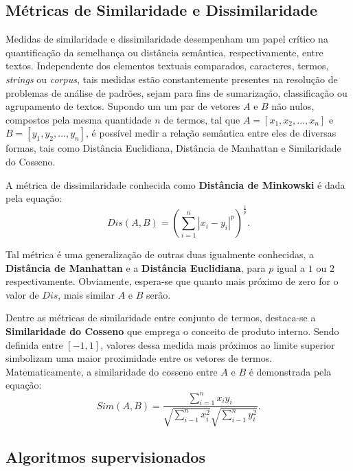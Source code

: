 \documentclass{SBCbookchapter}
\begin{document}
\subsection{Métricas de Similaridade e Dissimilaridade}
\label{subsec:similaridade}

Medidas de similaridade e dissimilaridade desempenham um papel crítico na quantificação da semelhança ou distância semântica, respectivamente, entre textos. Independente dos elementos textuais comparados, caracteres, termos, \textit{strings} ou \textit{corpus}, tais medidas estão constantemente presentes na resolução de problemas de análise de padrões, sejam para fins de sumarização, classificação ou agrupamento de textos. Supondo um um par de vetores $A$ e $B$ não nulos, compostos pela mesma quantidade $n$ de termos, tal que $A = [x_{1},x_{2},...,x_{n}]$ e $B = [y_{1},y_{2},...,y_{n}]$, é possível medir a relação semântica entre eles de diversas formas, tais como Distância Euclidiana, Distância de Manhattan e Similaridade do Cosseno.

A métrica de dissimilaridade conhecida como \textbf{Distância de Minkowski} é dada pela equação:
\begin{equation} 
Dis (A,B) =\left ( \sum_{i=1}^{n} \left |x_{i}-y_{i}\right|^{p}\right )^{\frac{1}{p}}.
\label{eq:minkowski}
\end{equation}

\noindent Tal métrica é uma generalização de outras duas igualmente conhecidas, a \textbf{Distância de Manhattan} e a \textbf{Distância Euclidiana}, para $p$ igual a $1$ ou $2$ respectivamente. Obviamente, espera-se que quanto mais próximo de zero for o valor de $Dis$, mais similar $A$ e $B$ serão.

Dentre as métricas de similaridade entre conjunto de termos, destaca-se a \textbf{Similaridade do Cosseno} que emprega o conceito de produto interno. Sendo definida entre $[-1,1]$, valores dessa medida mais próximos ao limite superior simbolizam uma maior proximidade entre os vetores de termos.
Matematicamente, a similaridade do cosseno entre $A$ e $B$ é demonstrada pela equação:
\begin{equation} 
Sim(A,B)=\frac{\sum_{i=1}^{n}x_i y_i}{\sqrt{\sum_{i-1}^{n}x_i^{2}}\sqrt{\sum_{i-1}^{n}y_i^{2} }}.
\label{eq:cosseno}
\end{equation}

\subsection{Algoritmos supervisionados}
\label{subsec:supervisionados}
\end{document}
